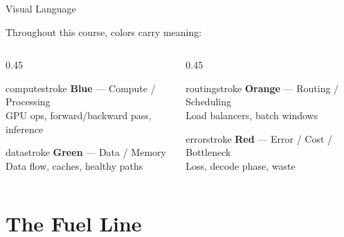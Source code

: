 \documentclass[aspectratio=169, 12pt]{beamer}
\begin{document}
\begin{frame}{Visual Language}
\note{
[0.5 min]
}

\small
Throughout this course, colors carry meaning:

\vspace{0.3cm}
\begin{columns}[T]
  \begin{column}{0.45\textwidth}
    \begin{mlsyscard}{computestroke}
    \textbf{Blue} --- Compute / Processing\\
    {\footnotesize GPU ops, forward/backward pass, inference}
    \end{mlsyscard}
    \vspace{0.15cm}
    \begin{mlsyscard}{datastroke}
    \textbf{Green} --- Data / Memory\\
    {\footnotesize Data flow, caches, healthy paths}
    \end{mlsyscard}
  \end{column}
  \begin{column}{0.45\textwidth}
    \begin{mlsyscard}{routingstroke}
    \textbf{Orange} --- Routing / Scheduling\\
    {\footnotesize Load balancers, batch windows}
    \end{mlsyscard}
    \vspace{0.15cm}
    \begin{mlsyscard}{errorstroke}
    \textbf{Red} --- Error / Cost / Bottleneck\\
    {\footnotesize Loss, decode phase, waste}
    \end{mlsyscard}
  \end{column}
\end{columns}
\end{frame}



\section{The Fuel Line}
\end{document}
